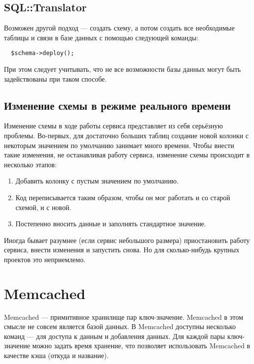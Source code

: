 \subsection{SQL::Translator}
Возможен другой подход --- создать схему, а потом создать все необходимые таблицы и связи в базе данных с помощью следующей команды:
\begin{verbatim}
  $schema->deploy();
\end{verbatim}
При этом следует учитывать, что не все возможности базы данных могут быть задействованы при таком способе. %

\subsection{Изменение схемы в режиме реального времени} %
Изменение схемы в ходе работы сервиса представляет из себя серьёзную проблемы. Во-первых, для достаточно больших таблиц создание новой колонки с некоторым значением по умолчанию занимает много времени. Чтобы внести такие изменения, не останавливая работу сервиса, изменение схемы происходит в несколько этапов:
\begin{enumerate}[nosep]
  \item Добавить колонку с пустым значением по умолчанию.
  \item Код переписывается таким образом, чтобы он мог работать и со старой схемой, и с новой.
  \item Постепенно вносить данные и заполнять стандартное значение.
\end{enumerate}
Иногда бывает разумнее (если сервис небольшого размера) приостановить работу сервиса, внести изменения и запустить снова. Но для сколько-нибудь крупных проектов это неприемлемо.

\section{Memcached}
Memcached --- примитивное хранилище пар ключ-значение. Memcached в этом смысле не совсем является базой данных. В Memcached доступны несколько команд --- для доступа к данным и добавления данных. Для каждой пары ключ-значение можно задать время хранение, что позволяет использовать Memcached в качестве кэша (откуда и название).

